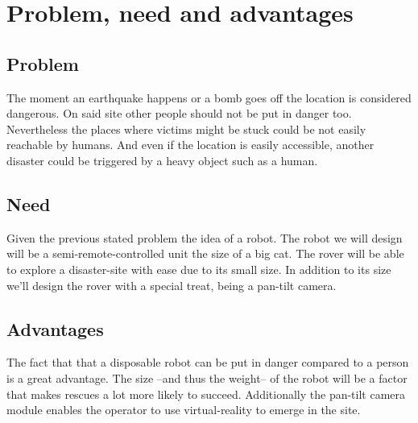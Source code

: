 \section{Problem, need and advantages}

\subsection{Problem}
The moment an earthquake happens or a bomb goes off the location is considered dangerous. On said site other people should not be put in danger too. Nevertheless the places where victims might be stuck could be not easily reachable by humans. And even if the location is easily accessible, another disaster could be triggered by a heavy object such as a human.

\subsection{Need}
Given the previous stated problem the idea of a robot. The robot we will design will be a semi-remote-controlled unit the size of a big cat. The rover will be able to explore a disaster-site with ease due to its small size. In addition to its size we'll design the rover with a special treat, being a pan-tilt camera.

\subsection{Advantages}
The fact that that a disposable robot can be put in danger compared to a person is a great advantage. The size --and thus the weight-- of the robot will be a factor that makes rescues a lot more likely to succeed. Additionally the pan-tilt camera module enables the operator to use virtual-reality to emerge in the site.
